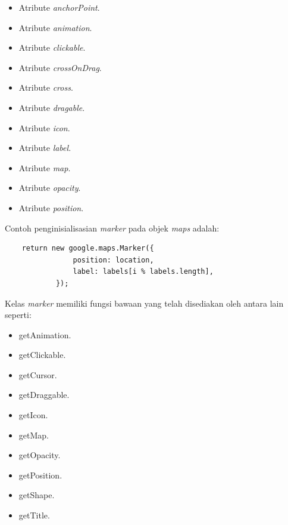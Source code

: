 \begin{itemize}
    \item Atribute \textit{anchorPoint}.
    \item Atribute \textit{animation}.
    \item Atribute \textit{clickable}.
    \item Atribute \textit{crossOnDrag}.
    \item Atribute \textit{cross}.
    \item Atribute \textit{dragable}.
    \item Atribute \textit{icon}.
    \item Atribute \textit{label}.
    \item Atribute \textit{map}.
    \item Atribute \textit{opacity}.
    \item Atribute \textit{position}.
\end{itemize}
Contoh penginisialisasian \textit{marker} pada  objek \textit{maps} adalah:
\begin{lstlisting}
    return new google.maps.Marker({
                position: location,
                label: labels[i % labels.length],
            });
\end{lstlisting}
Kelas \textit{marker} memiliki fungsi bawaan yang telah disediakan oleh antara lain seperti:
\begin{itemize}
    \item getAnimation.
    \item getClickable.
    \item getCursor.
    \item getDraggable.
    \item getIcon.
    \item getMap.
    \item getOpacity.
    \item getPosition.
    \item getShape.
    \item getTitle.
\end{itemize}

